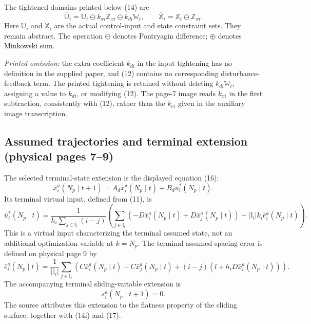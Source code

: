 \documentclass{article}
\begin{document}
The tightened domains printed below (14) are
\[
\boxed{\quad
\overline{\mathbb U}_i
=\mathbb U_i\ominus k_{xi}\mathbb Z_{xi}\ominus k_{di}\mathbb W_i,
\qquad
\overline{\mathbb X}_i=\mathbb X_i\ominus\mathbb Z_{xi}.
\quad}
\]
Here $\mathbb U_i$ and $\mathbb X_i$ are the actual control-input and state constraint sets. They remain abstract. The operation $\ominus$ denotes Pontryagin difference; $\oplus$ denotes Minkowski sum.

\emph{Printed omission:} the extra coefficient $k_{di}$ in the input tightening has no definition in the supplied paper, and (12) contains no corresponding disturbance-feedback term. The printed tightening is retained without deleting $k_{di}\mathbb W_i$, assigning a value to $k_{di}$, or modifying (12). The page-7 image reads $k_{xi}$ in the first subtraction, consistently with (12), rather than the $k_{ci}$ given in the auxiliary image transcription.

\subsection*{Assumed trajectories and terminal extension (physical pages 7--9)}
The selected terminal-state extension is the displayed equation (16):
\begin{equation}
\bar x_i^a(N_p\mid t+1)
=A_d\bar x_i^a(N_p\mid t)+B_d\bar u_i^*(N_p\mid t).
\tag{16}
\end{equation}
Its terminal virtual input, defined from (11), is
\begin{equation}
\bar u_i^*(N_p\mid t)=
\frac{1}{\displaystyle h_i\sum_{j\in\mathbb I_i}(i-j)}
\left(
\sum_{j\in\mathbb I_i}
\left(-D\bar x_i^a(N_p\mid t)+D\bar x_j^a(N_p\mid t)\right)
-|\mathbb I_i|k_i\bar e_i^a(N_p\mid t)
\right).
\tag{17}
\end{equation}
This is a virtual input characterizing the terminal assumed state, not an additional optimization variable at $k=N_p$. The terminal assumed spacing error is defined on physical page 9 by
\[
\bar e_i^a(N_p\mid t)=\frac{1}{|\mathbb I_i|}\sum_{j\in\mathbb I_i}
\left(C\bar x_i^a(N_p\mid t)-C\bar x_j^a(N_p\mid t)
 +(i-j)\left(l+h_iD\bar x_i^a(N_p\mid t)\right)\right).
\]
The accompanying terminal sliding-variable extension is
\[
s_i^a(N_p\mid t+1)=0.
\]
The source attributes this extension to the flatness property of the sliding surface, together with (14i) and (17).
\end{document}
